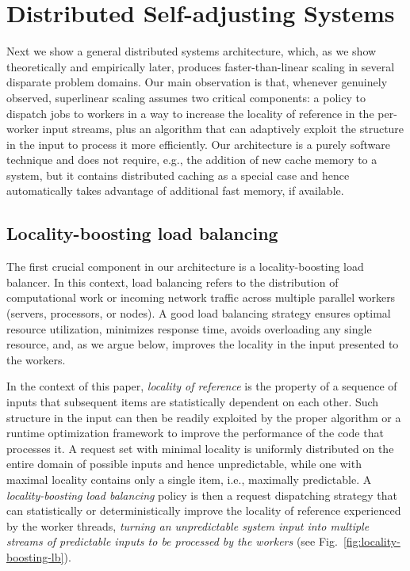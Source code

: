 \section{Distributed Self-adjusting Systems}
\label{sec:architecture}

Next we show a general distributed systems architecture, which, as we show theoretically and empirically later, produces faster-than-linear scaling in several disparate problem domains. Our main observation is that, whenever genuinely observed, superlinear scaling assumes two critical components: a policy to dispatch jobs to workers in a way to increase the locality of reference in the per-worker input streams, plus an algorithm that can adaptively exploit the structure in the input to process it more efficiently. Our architecture is a purely software technique and does not require, e.g., the addition of new cache memory to a system, but it contains distributed caching as a special case and hence automatically takes advantage of additional fast memory, if available.

\subsection{Locality-boosting load balancing}
\label{sec:lb-lb}

The first crucial component in our architecture is a locality-boosting load balancer.  In this context, load balancing refers to the distribution of computational work or incoming network traffic across multiple parallel workers (servers, processors, or nodes). A good load balancing strategy ensures optimal resource utilization, minimizes response time, avoids overloading any single resource, and, as we argue below, improves the locality in the input presented to the workers. 

In the context of this paper, \emph{locality of reference} is the property of a sequence of inputs that subsequent items are statistically dependent on each other. Such structure in the input can then be readily exploited by the proper algorithm \cite{SleatorT85Splay, BentleyCL93, HesterH85, HesterH85, BentleySTW86, Avin0020, ParkM12} or a runtime optimization framework \cite{276946,246322,10.1145/3503222.3507769,procieee_2019} to improve the performance of the code that processes it. A request set with minimal locality is uniformly distributed on the entire domain of possible inputs and hence unpredictable, while one with maximal locality contains only a single item, i.e., maximally predictable. A \emph{locality-boosting load balancing} policy is then a request dispatching strategy that can statistically or deterministically improve the locality of reference experienced by the worker threads, \emph{turning an unpredictable system input into multiple streams of predictable inputs to be processed by the workers} (see Fig.~\ref{fig:locality-boosting-lb}).

